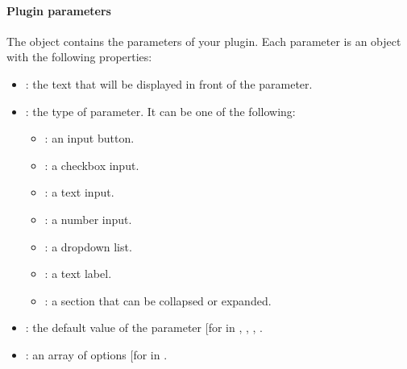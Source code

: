 \documentclass[letterpaper,10pt,english,openany,oneside]{sphinxmanual}
\begin{document}
\paragraph{Plugin parameters}
\label{\detokenize{docs/starting/plugins:plugin-parameters}}
\sphinxAtStartPar
The  object contains the parameters of your plugin. Each parameter is an object with the following properties:
\begin{itemize}
\item {} 
\sphinxAtStartPar
{}: the text that will be displayed in front of the parameter.

\item {} 
\sphinxAtStartPar
{}: the type of parameter. It can be one of the following:
\begin{itemize}
\item {} 
\sphinxAtStartPar
{}: an input button.

\item {} 
\sphinxAtStartPar
{}: a checkbox input.

\item {} 
\sphinxAtStartPar
{}: a text input.

\item {} 
\sphinxAtStartPar
{}: a number input.

\item {} 
\sphinxAtStartPar
{}: a dropdown list.

\item {} 
\sphinxAtStartPar
{}: a text label.

\item {} 
\sphinxAtStartPar
{}: a section that can be collapsed or expanded.

\end{itemize}

\item {} 
\sphinxAtStartPar
{}: the default value of the parameter {[}for  in , , , \sphinxcode{\sphinxupquote{text}}{]}.

\item {} 
\sphinxAtStartPar
{}: an array of options {[}for  in \sphinxcode{\sphinxupquote{select}}{]}.


\end{itemize}
\end{document}
